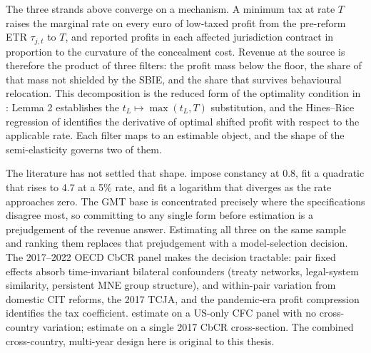 \documentclass[11pt,a4paper]{article}
\begin{document}
The three strands above converge on a mechanism. A minimum tax at rate $T$ raises the marginal rate on every euro of low-taxed profit from the pre-reform ETR $\tau_{j,t}$ to $T$, and reported profits in each affected jurisdiction contract in proportion to the curvature of the concealment cost. Revenue at the source is therefore the product of three filters: the profit mass below the floor, the share of that mass not shielded by the SBIE, and the share that survives behavioural relocation. This decomposition is the reduced form of the optimality condition in \citet{johannesen2022}: Lemma 2 establishes the $t_L \mapsto \max(t_L, T)$ substitution, and the Hines--Rice regression of \citet{hines1994} identifies the derivative of optimal shifted profit with respect to the applicable rate. Each filter maps to an estimable object, and the shape of the semi-elasticity governs two of them.

The literature has not settled that shape. \citet{heckemeyer2017} impose constancy at 0.8, \citet{dowd2017} fit a quadratic that rises to 4.7 at a 5\% rate, and \citet{garcia-bernardo2024} fit a logarithm that diverges as the rate approaches zero. The GMT base is concentrated precisely where the specifications disagree most, so committing to any single form before estimation is a prejudgement of the revenue answer. Estimating all three on the same sample and ranking them replaces that prejudgement with a model-selection decision. The 2017--2022 OECD CbCR panel makes the decision tractable: pair fixed effects absorb time-invariant bilateral confounders (treaty networks, legal-system similarity, persistent MNE group structure), and within-pair variation from domestic CIT reforms, the 2017 TCJA, and the pandemic-era profit compression identifies the tax coefficient. \citet{dowd2017} estimate on a US-only CFC panel with no cross-country variation; \citet{garcia-bernardo2024} estimate on a single 2017 CbCR cross-section. The combined cross-country, multi-year design here is original to this thesis.
\end{document}
